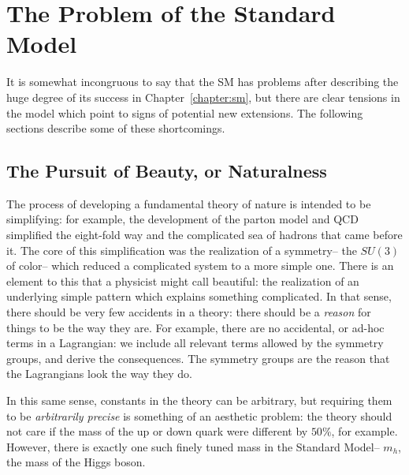 \label{chapter:susy}

\section{The Problem of the Standard Model}
\label{chapter:susy:problems}

It is somewhat incongruous to say that the SM has problems after describing the huge degree of its success in Chapter~\ref{chapter:sm}, but there are clear tensions in the model which point to signs of potential new extensions. The following sections describe some of these shortcomings.

\subsection{The Pursuit of Beauty, or Naturalness}

The process of developing a fundamental theory of nature is intended to be simplifying: for example, the development of the parton model and QCD simplified the eight-fold way and the complicated sea of hadrons  that came before it. The core of this simplification was the realization of a symmetry-- the $SU(3)$ of color-- which reduced a complicated system to a more simple one. There is an element to this that a physicist might call beautiful: the realization of an underlying simple pattern which explains something complicated. In that sense, there should be very few accidents in a theory: there should be a \textit{reason} for things to be the way they are. For example, there are no accidental, or ad-hoc terms in a Lagrangian: we include all relevant terms allowed by the symmetry groups, and derive the consequences. The symmetry groups are the reason that the Lagrangians look the way they do.

In this same sense, constants in the theory can be arbitrary, but requiring them to be \textit{arbitrarily precise} is something of an aesthetic problem: the theory should not care if the mass of the up or down quark were different by $50\%$, for example. However, there is exactly one such finely tuned mass in the Standard Model-- $m_h$, the mass of the Higgs boson. 

